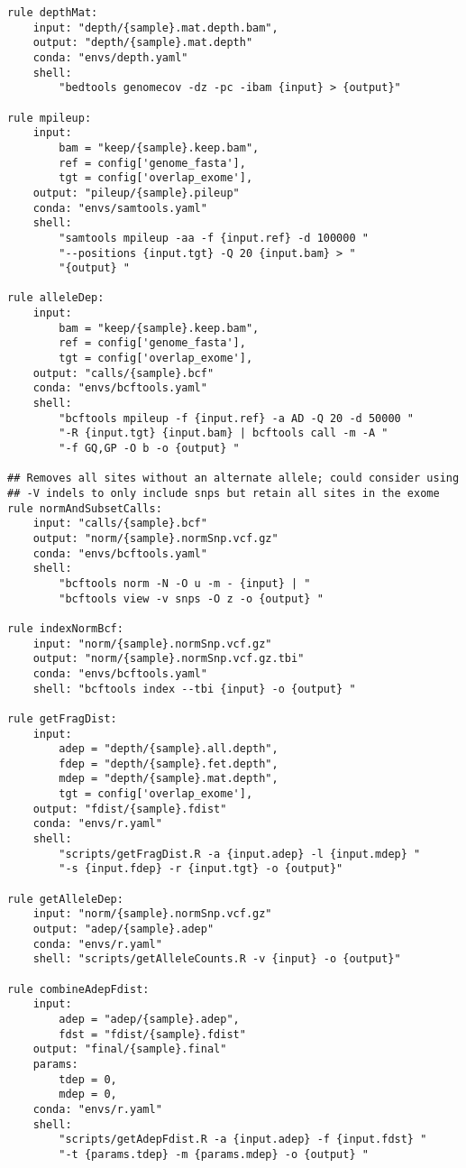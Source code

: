 \documentclass{article}\usepackage[]{graphicx}\usepackage[]{color}
\makeatletter
\newenvironment{kframe}{%
 \def\at@end@of@kframe{}%
 \ifinner\ifhmode%
  \def\at@end@of@kframe{\end{minipage}}%
  \begin{minipage}{\columnwidth}%
 \fi\fi%
 \def\FrameCommand##1{\hskip\@totalleftmargin \hskip-\fboxsep
 \colorbox{shadecolor}{##1}\hskip-\fboxsep
     \hskip-\linewidth \hskip-\@totalleftmargin \hskip\columnwidth}%
 \MakeFramed {\advance\hsize-\width
   \@totalleftmargin\z@ \linewidth\hsize
   \@setminipage}}%
 {\par\unskip\endMakeFramed%
 \at@end@of@kframe}
\newenvironment{knitrout}{}{} %
\makeatother
\begin{document}
\begin{knitrout}
\begin{kframe}
\begin{verbatim}
rule depthMat:
    input: "depth/{sample}.mat.depth.bam",
    output: "depth/{sample}.mat.depth"
    conda: "envs/depth.yaml"
    shell:
        "bedtools genomecov -dz -pc -ibam {input} > {output}"

rule mpileup:
    input: 
        bam = "keep/{sample}.keep.bam",
        ref = config['genome_fasta'],
        tgt = config['overlap_exome'],
    output: "pileup/{sample}.pileup"
    conda: "envs/samtools.yaml"
    shell:
        "samtools mpileup -aa -f {input.ref} -d 100000 "
        "--positions {input.tgt} -Q 20 {input.bam} > "
        "{output} "

rule alleleDep:
    input: 
        bam = "keep/{sample}.keep.bam",
        ref = config['genome_fasta'],
        tgt = config['overlap_exome'],
    output: "calls/{sample}.bcf"
    conda: "envs/bcftools.yaml"
    shell:
        "bcftools mpileup -f {input.ref} -a AD -Q 20 -d 50000 "
        "-R {input.tgt} {input.bam} | bcftools call -m -A "
        "-f GQ,GP -O b -o {output} "

## Removes all sites without an alternate allele; could consider using
## -V indels to only include snps but retain all sites in the exome
rule normAndSubsetCalls:
    input: "calls/{sample}.bcf"
    output: "norm/{sample}.normSnp.vcf.gz"
    conda: "envs/bcftools.yaml"
    shell:
        "bcftools norm -N -O u -m - {input} | "
        "bcftools view -v snps -O z -o {output} "

rule indexNormBcf:
    input: "norm/{sample}.normSnp.vcf.gz"
    output: "norm/{sample}.normSnp.vcf.gz.tbi"
    conda: "envs/bcftools.yaml"
    shell: "bcftools index --tbi {input} -o {output} "
    
rule getFragDist:
    input: 
        adep = "depth/{sample}.all.depth",
        fdep = "depth/{sample}.fet.depth",
        mdep = "depth/{sample}.mat.depth",
        tgt = config['overlap_exome'],
    output: "fdist/{sample}.fdist"
    conda: "envs/r.yaml"
    shell: 
        "scripts/getFragDist.R -a {input.adep} -l {input.mdep} "
        "-s {input.fdep} -r {input.tgt} -o {output}"

rule getAlleleDep:
    input: "norm/{sample}.normSnp.vcf.gz"
    output: "adep/{sample}.adep"
    conda: "envs/r.yaml"
    shell: "scripts/getAlleleCounts.R -v {input} -o {output}"

rule combineAdepFdist:
    input:
        adep = "adep/{sample}.adep",
        fdst = "fdist/{sample}.fdist"
    output: "final/{sample}.final"
    params: 
        tdep = 0,
        mdep = 0,
    conda: "envs/r.yaml"
    shell:
        "scripts/getAdepFdist.R -a {input.adep} -f {input.fdst} "
        "-t {params.tdep} -m {params.mdep} -o {output} "


\end{verbatim}
\end{kframe}
\end{knitrout}
\end{document}
